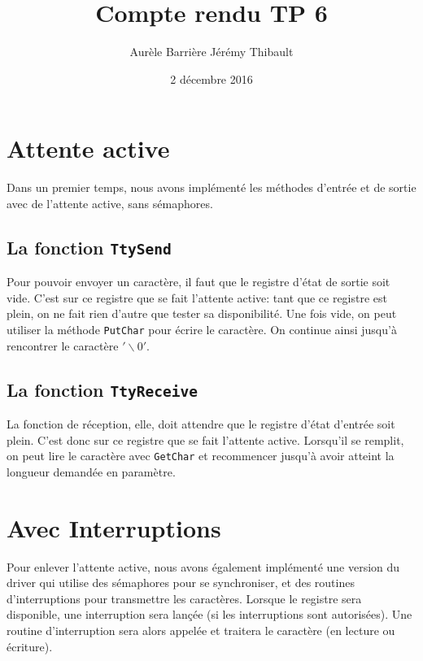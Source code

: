 \documentclass{article}
\title{Compte rendu TP 6}
\author{Aurèle Barrière \quad Jérémy Thibault}
\date{2 décembre 2016}
\def\fun#1{\texttt{#1}}
\def\zero{$'\backslash0'$}
\begin{document}
\maketitle

\section{Attente active}
Dans un premier temps, nous avons implémenté les méthodes d'entrée et de sortie avec de l'attente active, sans sémaphores.
\subsection{La fonction \fun{TtySend}}
Pour pouvoir envoyer un caractère, il faut que le registre d'état de sortie soit vide. C'est sur ce registre que se fait l'attente active: tant que ce registre est plein, on ne fait rien d'autre que tester sa disponibilité. Une fois vide, on peut utiliser la méthode \fun{PutChar} pour écrire le caractère. On continue ainsi jusqu'à rencontrer le caractère \zero.


\subsection{La fonction \fun{TtyReceive}}
La fonction de réception, elle, doit attendre que le registre d'état d'entrée soit plein. C'est donc sur ce registre que se fait l'attente active. Lorsqu'il se remplit, on peut lire le caractère avec \fun{GetChar} et recommencer jusqu'à avoir atteint la longueur demandée en paramètre.


\section{Avec Interruptions}
Pour enlever l'attente active, nous avons également implémenté une version du driver qui utilise des sémaphores pour se synchroniser, et des routines d'interruptions pour transmettre les caractères. Lorsque le registre sera disponible, une interruption sera lançée (si les interruptions sont autorisées). Une routine d'interruption sera alors appelée et traitera le caractère (en lecture ou écriture).
\end{document}

